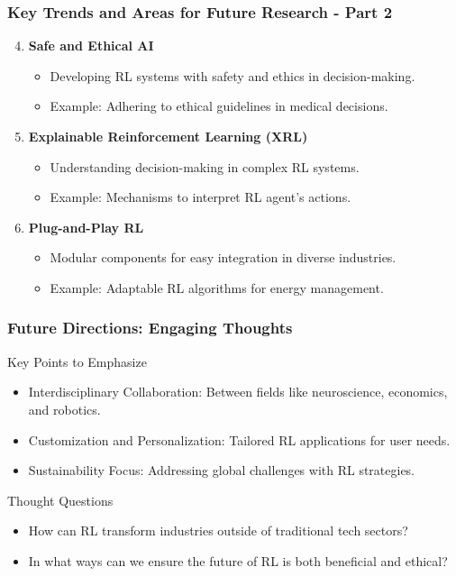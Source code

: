 \documentclass[aspectratio=169]{beamer}
\begin{document}
\begin{frame}[fragile]
    \frametitle{Key Trends and Areas for Future Research - Part 2}
    
    \begin{enumerate}
        \setcounter{enumi}{3} %
        \item \textbf{Safe and Ethical AI}
        \begin{itemize}
            \item Developing RL systems with safety and ethics in decision-making.
            \item Example: Adhering to ethical guidelines in medical decisions.
        \end{itemize}

        \item \textbf{Explainable Reinforcement Learning (XRL)}
        \begin{itemize}
            \item Understanding decision-making in complex RL systems.
            \item Example: Mechanisms to interpret RL agent's actions.
        \end{itemize}

        \item \textbf{Plug-and-Play RL}
        \begin{itemize}
            \item Modular components for easy integration in diverse industries.
            \item Example: Adaptable RL algorithms for energy management.
        \end{itemize}
    \end{enumerate}
\end{frame}

\begin{frame}[fragile]
    \frametitle{Future Directions: Engaging Thoughts}
    
    \begin{block}{Key Points to Emphasize}
        \begin{itemize}
            \item Interdisciplinary Collaboration: Between fields like neuroscience, economics, and robotics.
            \item Customization and Personalization: Tailored RL applications for user needs.
            \item Sustainability Focus: Addressing global challenges with RL strategies.
        \end{itemize}
    \end{block}

    \begin{block}{Thought Questions}
        \begin{itemize}
            \item How can RL transform industries outside of traditional tech sectors?
            \item In what ways can we ensure the future of RL is both beneficial and ethical?
        \end{itemize}
    \end{block}
\end{frame}
\end{document}
